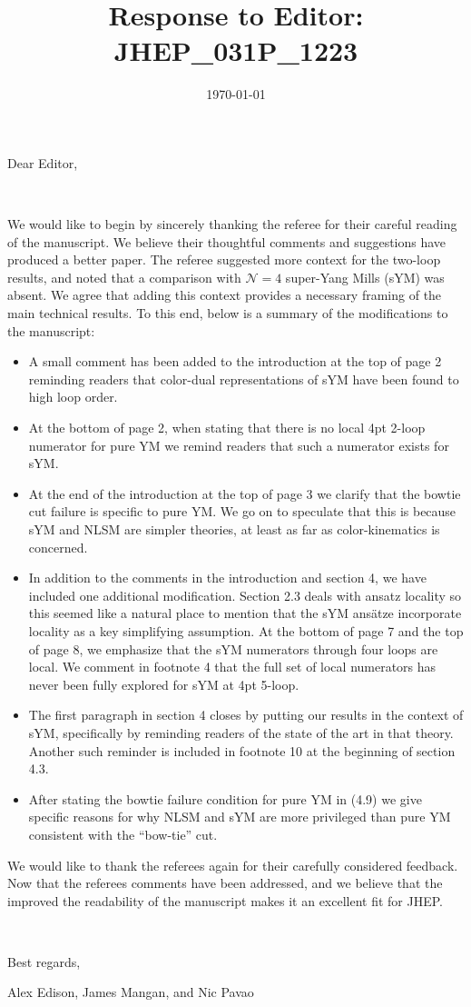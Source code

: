 \documentclass[notitlepage, 12pt]{revtex4-1}
\begin{document}
\title{Response to Editor: JHEP\_031P\_1223}

\date{\today}

\maketitle
Dear Editor, 

\

We would like to begin by sincerely thanking the referee for their careful reading of the manuscript.
We believe their thoughtful comments and suggestions have produced a better paper.
The referee suggested more context for the two-loop results, and noted that a comparison with $\mathcal{N}=4$ super-Yang Mills (sYM) was absent. We agree that adding this context provides a necessary framing of the main technical results.
To this end, below is a summary of the modifications to the manuscript:
\begin{itemize}
\item A small comment has been added to the introduction at the top of page 2 reminding readers that color-dual representations of sYM have been found to high loop order.
\item At the bottom of page 2, when stating that there is no local 4pt 2-loop numerator for pure YM we remind readers that such a numerator exists for sYM.
\item At the end of the introduction at the top of page 3 we clarify that the bowtie cut failure is specific to pure YM.
We go on to speculate that this is because sYM and NLSM are simpler theories, at least as far as color-kinematics is concerned.
\item In addition to the comments in the introduction and section 4, we have included one additional modification.
Section 2.3 deals with ansatz locality so this seemed like a natural place to mention that the sYM ans\"atze incorporate locality as a key simplifying assumption.
At the bottom of page 7 and the top of page 8, we emphasize that the sYM numerators through four loops are local.
We comment in footnote 4 that the full set of local numerators has never been fully explored for sYM at 4pt 5-loop.
\item The first paragraph in section 4 closes by putting our results in the context of sYM, specifically by reminding readers of the state of the art in that theory. Another such reminder is included in footnote 10 at the beginning of section 4.3. 
\item After stating the bowtie failure condition for pure YM in (4.9) we give specific reasons for why NLSM and sYM are more privileged than pure YM consistent with the ``bow-tie'' cut. 
\end{itemize}


We would like to thank the referees again for their carefully considered feedback.
Now that the referees comments have been addressed, and we believe that the improved the readability of the manuscript makes it an excellent fit for JHEP.

\

Best regards,

Alex Edison, James Mangan, and Nic Pavao
\end{document}
